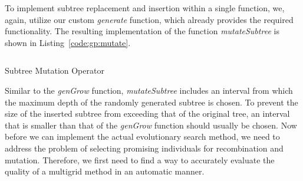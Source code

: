 To implement subtree replacement and insertion within a single function, we, again, utilize our custom \emph{generate} function, which already provides the required functionality.
The resulting implementation of the function \emph{mutateSubtree} is shown in Listing~\ref{code:gp:mutate}.
\begin{listing}[ht]
	\inputminted{python}{evostencils/gp/mutate.py}
	\caption{Subtree Mutation Operator}
	\label{code:gp:mutate}
\end{listing}
Similar to the \emph{genGrow} function, \emph{mutateSubtree} includes an interval from which the maximum depth of the randomly generated subtree is chosen.
To prevent the size of the inserted subtree from exceeding that of the original tree, an interval that is smaller than that of the \emph{genGrow} function should usually be chosen.
Now before we can implement the actual evolutionary search method, we need to address the problem of selecting promising individuals for recombination and mutation.
Therefore, we first need to find a way to accurately evaluate the quality of a multigrid method in an automatic manner.

